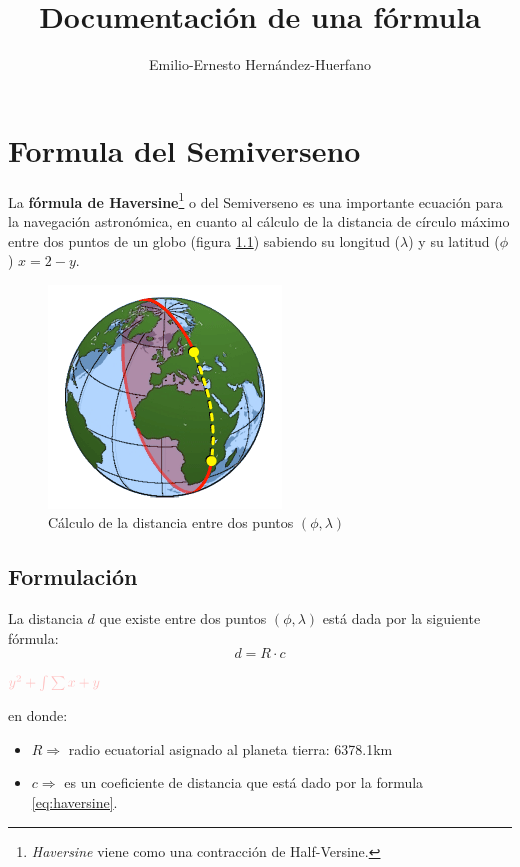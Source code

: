 \documentclass[12pt,letterpaper,oneside]{book}
\title{Documentación de una fórmula}
\author{Emilio-Ernesto Hernández-Huerfano}
\begin{document}
\maketitle
\chapter{Formula del Semiverseno}
\noindent La \textbf{fórmula de Haversine}\footnote{\textit{Haversine} viene como una contracción de Half-Versine.} o del Semiverseno es una importante ecuación para la navegación astronómica, en cuanto al cálculo de la distancia de círculo máximo entre dos puntos de un globo (figura \ref{fig:haversine}) sabiendo su longitud ($\lambda$) y su latitud ($\phi$) $x = 2 - y$.


\begin{figure}[h]
\centering
\includegraphics[scale=.8]{img/haversine.png}
\caption{Cálculo de la distancia entre dos puntos $(\phi, \lambda)$}
\label{fig:haversine}
\end{figure}


\section{Formulación}
La distancia $d$ que existe entre dos puntos $(\phi, \lambda)$ está dada por la siguiente fórmula:$$d=R \cdot c$$

${\color{pink} y ^{2} + \int \sum x + y}$

en donde:
\begin{itemize}
\item $R \Rightarrow$  radio ecuatorial asignado al planeta tierra: 6378.1km
\item $c \Rightarrow$ es un coeficiente de distancia que está dado por la formula \ref{eq:haversine}.
\end{itemize}
\end{document}
